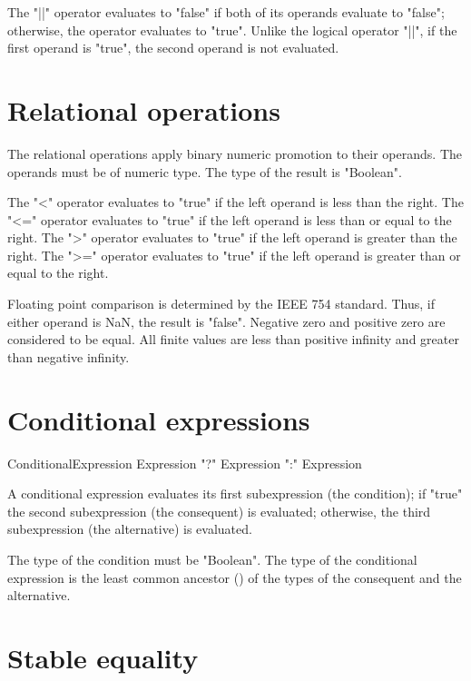 The \xcd"||" operator  evaluates to \xcd"false" if both of its
operands evaluate to \xcd"false"; otherwise, the operator
evaluates to \xcd"true".
Unlike the logical operator \xcd"||",
if the first operand is \xcd"true",
the second operand is not evaluated.

\section{Relational operations} 

The relational operations apply binary numeric promotion
to their operands. The operands must be of numeric type.
The type of the result is \xcd"Boolean".

The \xcd"<" operator evaluates to \xcd"true" if the left operand is
less than the right.
The \xcd"<=" operator evaluates to \xcd"true" if the left operand is
less than or equal to the right.
The \xcd">" operator evaluates to \xcd"true" if the left operand is
greater than the right.
The \xcd">=" operator evaluates to \xcd"true" if the left operand is
greater than or equal to the right.

Floating point comparison is determined by the IEEE 754
standard.  Thus,
if either operand is NaN, the result is \xcd"false".
Negative zero and positive zero are considered to be equal.
All finite values are less than positive infinity and greater
than negative infinity.

\section{Conditional expressions}
\label{Conditional}

\begin{grammar}
ConditionalExpression \: Expression
                \xcd"?" Expression
                \xcd":" Expression \\
\end{grammar}

A conditional expression evaluates its first subexpression (the
condition); if \xcd"true"
the second subexpression (the consequent) is evaluated; otherwise,
the third subexpression (the alternative) is evaluated.

The type of the condition must be \xcd"Boolean".
The type of the conditional expression is the least common
ancestor () of the types of the consequent and the alternative.

\section{Stable equality}\label{StableEquality}\index{==}\index{!=}

